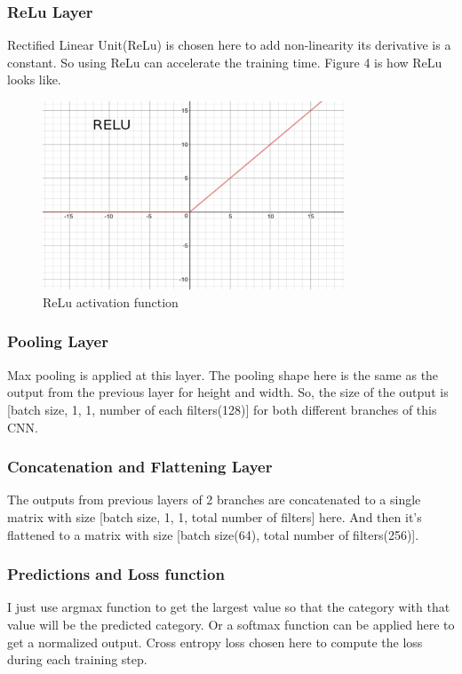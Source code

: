 \documentclass[12pt]{spieman}
\begin{document}
\begin{spacing}{1.5}
        \subsubsection{ReLu Layer}
        Rectified Linear Unit(ReLu) is chosen here to add non-linearity  its derivative is a constant. So using ReLu can accelerate the training time. Figure 4 is how ReLu looks like.
        \begin{figure}[h!]
        \centering
        \includegraphics[width=0.80\textwidth]{figures/relu.png}
        \caption{ReLu activation function}
        \label{threadsVsSync}
        \end{figure}
        \subsubsection{Pooling Layer}
        Max pooling is applied at this layer. The pooling shape here is the same as the output from the previous layer for height and width. So, the size of the output is [batch size, 1, 1, number of each filters(128)] for both different branches of this CNN.
        \subsubsection{Concatenation and Flattening Layer}
        The outputs from previous layers of 2 branches are concatenated to a single matrix with size [batch size, 1, 1, total number of filters] here. And then it's flattened to a matrix with size [batch size(64), total number of filters(256)].
        \subsubsection{Predictions and Loss function}
        I just use argmax function to get the largest value so that the category with that value will be the predicted category. Or a softmax function can be applied here to get a normalized output.
        Cross entropy loss chosen here to compute the loss during each training step.

\end{spacing}
\end{document}
